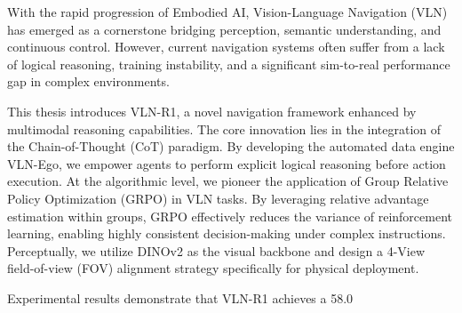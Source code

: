 \begin{abstract}
随着具身智能（Embodied AI）技术的飞速发展，视觉语言导航（VLN）作为打通感知、语义理解与连续控制的关键任务，已成为机器人领域的研究热点。然而，现有的导航系统在面对复杂场景时仍存在逻辑推理缺失、训练过程不稳定以及从仿真到实物的跨域迁移瓶颈等问题。

本文提出了一种全新的基于多模态推理能力增强的导航框架——VLN-R1。该系统核心创新在于引入了“思维链（Chain-of-Thought）”推理范式，通过构建自动化数据引擎 VLN-Ego，赋予智能体在执行动作前进行显式逻辑推演的能力。在算法层面，本文首次在导航任务中应用了组相对策略优化（GRPO）算法，利用组内相对优势估计有效降低了强化学习的训练方差，实现了复杂指令下的高一致性决策。在感知层面，本文采用了 DINOv2 作为视觉特征提取器，并设计了专为实物部署定制的 4-View 视场对齐方案。

实验结果表明，VLN-R1 在 R2R-CE 基准测试中成功率达到了 58.0%

\end{abstract}

\begin{englishabstract}
With the rapid progression of Embodied AI, Vision-Language Navigation (VLN) has emerged as a cornerstone bridging perception, semantic understanding, and continuous control. However, current navigation systems often suffer from a lack of logical reasoning, training instability, and a significant sim-to-real performance gap in complex environments.

This thesis introduces VLN-R1, a novel navigation framework enhanced by multimodal reasoning capabilities. The core innovation lies in the integration of the Chain-of-Thought (CoT) paradigm. By developing the automated data engine VLN-Ego, we empower agents to perform explicit logical reasoning before action execution. At the algorithmic level, we pioneer the application of Group Relative Policy Optimization (GRPO) in VLN tasks. By leveraging relative advantage estimation within groups, GRPO effectively reduces the variance of reinforcement learning, enabling highly consistent decision-making under complex instructions. Perceptually, we utilize DINOv2 as the visual backbone and design a 4-View field-of-view (FOV) alignment strategy specifically for physical deployment.

Experimental results demonstrate that VLN-R1 achieves a 58.0%

\end{englishabstract}
